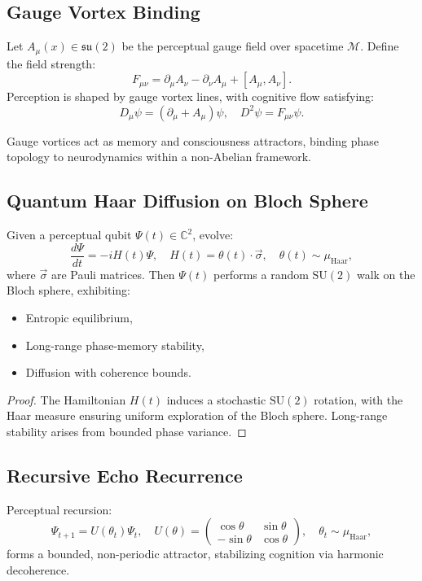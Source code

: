 \documentclass[12pt]{article}
\begin{document}
\subsection{Gauge Vortex Binding}
\begin{theorem}
Let \( A_\mu(x) \in \mathfrak{su}(2) \) be the perceptual gauge field over spacetime \( \mathcal{M} \). Define the field strength:
\[
F_{\mu\nu} = \partial_\mu A_\nu - \partial_\nu A_\mu + [A_\mu, A_\nu].
\]
Perception is shaped by gauge vortex lines, with cognitive flow satisfying:
\[
D_\mu \psi = (\partial_\mu + A_\mu) \psi, \quad D^2 \psi = F_{\mu\nu} \psi.
\]
\end{theorem}
\begin{interpretation}
Gauge vortices act as memory and consciousness attractors, binding phase topology to neurodynamics within a non-Abelian framework.
\end{interpretation}

\subsection{Quantum Haar Diffusion on Bloch Sphere}
\begin{lemma}
Given a perceptual qubit \( \Psi(t) \in \mathbb{C}^2 \), evolve:
\[
\frac{d\Psi}{dt} = -i H(t) \Psi, \quad H(t) = \theta(t) \cdot \vec{\sigma}, \quad \theta(t) \sim \mu_{\text{Haar}},
\]
where \( \vec{\sigma} \) are Pauli matrices. Then \( \Psi(t) \) performs a random \( \text{SU}(2) \) walk on the Bloch sphere, exhibiting:
\begin{itemize}
    \item Entropic equilibrium,
    \item Long-range phase-memory stability,
    \item Diffusion with coherence bounds.
\end{itemize}
\end{lemma}
\begin{proof}
The Hamiltonian \( H(t) \) induces a stochastic \( \text{SU}(2) \) rotation, with the Haar measure ensuring uniform exploration of the Bloch sphere. Long-range stability arises from bounded phase variance.
\end{proof}

\subsection{Recursive Echo Recurrence}
\begin{corollary}
Perceptual recursion:
\[
\Psi_{t+1} = U(\theta_t) \Psi_t, \quad U(\theta) = \begin{pmatrix} \cos \theta & \sin \theta \\ -\sin \theta & \cos \theta \end{pmatrix}, \quad \theta_t \sim \mu_{\text{Haar}},
\]
forms a bounded, non-periodic attractor, stabilizing cognition via harmonic decoherence.
\end{corollary}
\end{document}
